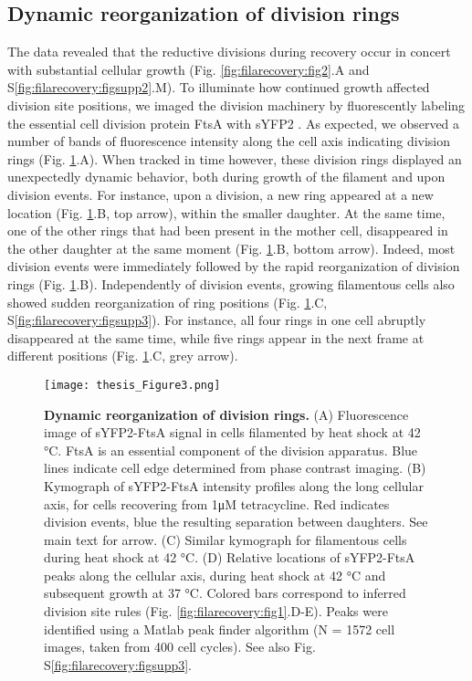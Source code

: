 \subsection{Dynamic reorganization of division rings}
The data revealed that the reductive divisions during recovery occur in concert with substantial cellular growth (Fig. \ref{fig:filarecovery:fig2}.A and S\ref{fig:filarecovery:figsupp2}.M). To illuminate how continued growth affected division site positions, we imaged the division machinery by fluorescently labeling the essential cell division protein FtsA with sYFP2 \cite{Erickson2010, Lutkenhaus2012}. As expected, we observed a number of bands of fluorescence intensity along the cell axis indicating division rings \cite{Addinall1997, Arjes2014, Mileykovskaya1998}  (Fig. \ref{fig:filarecovery:fig3}.A). When tracked in time however, these division rings displayed an unexpectedly dynamic behavior, both during growth of the filament and upon division events. For instance, upon a division, a new ring appeared at a new location (Fig. \ref{fig:filarecovery:fig3}.B, top arrow), within the smaller daughter. At the same time, one of the other rings that had been present in the mother cell, disappeared in the other daughter at the same moment (Fig. \ref{fig:filarecovery:fig3}.B, bottom arrow). Indeed, most division events were immediately followed by the rapid reorganization of division rings (Fig. \ref{fig:filarecovery:fig3}.B). Independently of division events, growing filamentous cells also showed sudden reorganization of ring positions (Fig. \ref{fig:filarecovery:fig3}.C, S\ref{fig:filarecovery:figsupp3}). For instance, all four rings in one cell abruptly disappeared at the same time, while five rings appear in the next frame at different positions (Fig. \ref{fig:filarecovery:fig3}.C, grey arrow).

\begin{figure}
    \centering
    \texttt{[image: thesis\_Figure3.png]}
    \caption{ 
        \textbf{Dynamic reorganization of division rings.}           
        (A) Fluorescence image of sYFP2-FtsA signal in cells filamented by heat shock at 42 °C. FtsA is an essential component of the division apparatus. Blue lines indicate cell edge determined from phase contrast imaging. (B) Kymograph of sYFP2-FtsA intensity profiles along the long cellular axis, for cells recovering from 1μM tetracycline. Red indicates division events, blue the resulting separation between daughters. See main text for arrow. (C) Similar kymograph for filamentous cells during heat shock at 42 °C. (D) Relative locations of sYFP2-FtsA peaks along the cellular axis, during heat shock at 42 °C and subsequent growth at 37 °C. Colored bars correspond to inferred division site rules (Fig. \ref{fig:filarecovery:fig1}.D-E). Peaks were identified using a Matlab peak finder algorithm (N = 1572 cell images, taken from 400 cell cycles). See also Fig. S\ref{fig:filarecovery:figsupp3}.        
    }
    \label{fig:filarecovery:fig3}
\end{figure}

